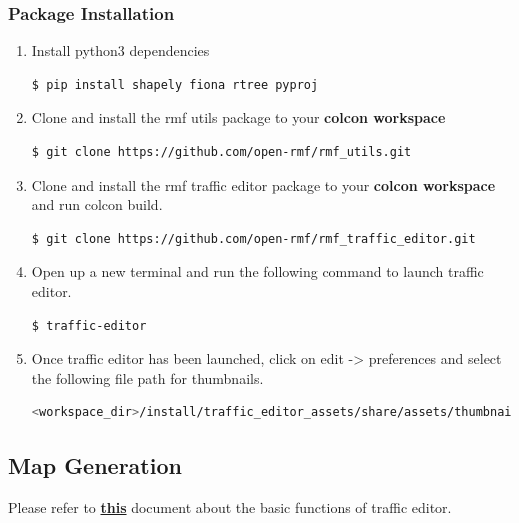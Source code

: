 \documentclass[11pt]{article}
\begin{document}
\subsubsection{Package Installation}
\begin{enumerate}
 \item{
       Install python3 dependencies
       \begin{lstlisting}[language=bash]
         $ pip install shapely fiona rtree pyproj
        \end{lstlisting}
       }
 \item {
       Clone and install the rmf utils package to your \textbf{colcon workspace}
       \begin{lstlisting}[language=bash]
        $ git clone https://github.com/open-rmf/rmf_utils.git
        \end{lstlisting}
       }
 \item {
       Clone and install the rmf traffic editor package to your \textbf{colcon workspace} and run colcon build.
       \begin{lstlisting}[language=bash]
         $ git clone https://github.com/open-rmf/rmf_traffic_editor.git
        \end{lstlisting}
       
       }
 \item {
       Open up a new terminal and run the following command to launch traffic editor.
       \begin{lstlisting}[language=bash]
         $ traffic-editor
        \end{lstlisting}
       }
 \item {
       Once traffic editor has been launched, click on edit -> preferences
       and select the following file path for thumbnails.
       \begin{lstlisting}[language=bash]
       <workspace_dir>/install/traffic_editor_assets/share/assets/thumbnails
        \end{lstlisting}
       }
\end{enumerate}
\subsection{Map Generation}
Please refer to
\href{ https://osrf.github.io/ros2multirobotbook/traffic-editor.html}{\textbf{this}} document about the basic functions of traffic editor.
\end{document}
